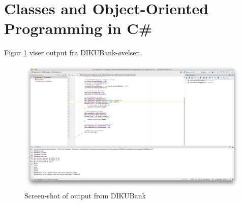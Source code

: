 \section{Classes and Object-Oriented Programming in C\#}
Figur \ref{fig:rider3} viser output fra DIKUBank-øvelsen.
\begin{figure}[ht]
  \centering
  \includegraphics[width=1\linewidth]{rider3}
  \caption{Screen-shot of output from DIKUBank}
  \label{fig:rider3}
\end{figure}
